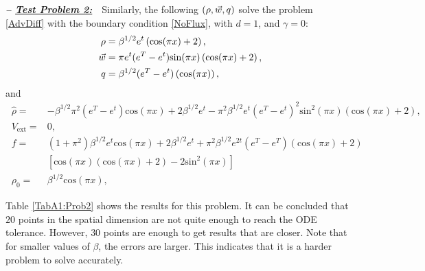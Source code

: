 \textbf{\emph{-- \underline{Test Problem 2:}}}~~Similarly, the following $(\rho,\vec{w},q)$ solve the problem \eqref{AdvDiff} with the boundary condition \eqref{NoFlux}, with $d=1$, and $\gamma = 0$:
\begin{align*}
\ \rho={}&\beta^{1/2}e^{t}\left(\text{cos}(\pi{}x)+2\right), \\
\ \vec{w}={}&\pi{}e^{t}(e^{T}-e^{t})\text{sin}(\pi{}x)\left(\text{cos}(\pi{}x)+2\right), \\
\ \adj={}&\beta^{1/2}(e^{T}-e^{t})\left(\text{cos}(\pi{}x)\right),
\end{align*}
and
\begin{align*}
\ \widehat{\rho}={}&-\beta^{1/2}\pi^2{}\left(e^{T}-e^{t}\right)\text{cos}(\pi{}x) +2\beta^{1/2}e^{t} -\pi^{2}\beta^{1/2}e^{t}(e^{T}-e^{t})^2\text{sin}^2(\pi{}x)\left(\text{cos}(\pi{}x)+2 \right), \\
\ V_{\text{ext}}={}&0, \\
\ f={}&(1+\pi^2)\beta^{1/2}e^{t}\text{cos}(\pi{}x) + 2\beta^{1/2}e^{t} +\pi^2\beta^{1/2}e^{2t}(e^{T}-e^{T})\left(\text{cos}(\pi{}x) +2\right)\\
&\left[\text{cos}(\pi{}x)\left(\text{cos}(\pi{}x) +2\right)-2\text{sin}^2(\pi{}x)\right] \\
\ \rho_{0}={}&\beta^{1/2}\text{cos}(\pi{}x),
\end{align*}

Table \ref{TabA1:Prob2} shows the results for this problem. It can be concluded that $20$ points in the spatial dimension are not quite enough to reach the ODE tolerance. However, $30$ points are enough to get results that are closer. Note that for smaller values of $\beta$, the errors are larger. This indicates that it is a harder problem to solve accurately. 

